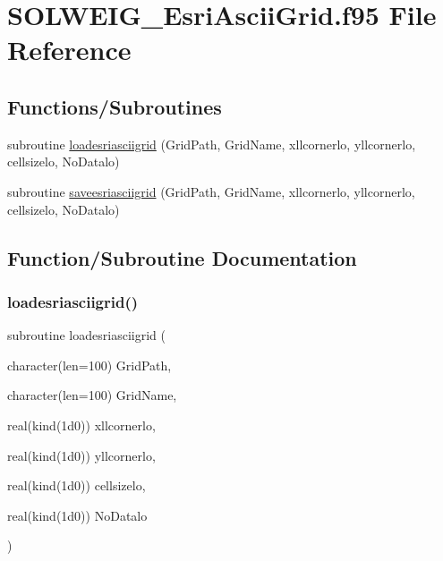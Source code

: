\hypertarget{_s_o_l_w_e_i_g___esri_ascii_grid_8f95}{}\section{S\+O\+L\+W\+E\+I\+G\+\_\+\+Esri\+Ascii\+Grid.\+f95 File Reference}
\label{_s_o_l_w_e_i_g___esri_ascii_grid_8f95}
\subsection*{Functions/\+Subroutines}
\begin{DoxyCompactItemize}
\item 
subroutine \hyperlink{_s_o_l_w_e_i_g___esri_ascii_grid_8f95_ac37f664443300ece9cc0c2682843415f}{loadesriasciigrid} (Grid\+Path, Grid\+Name, xllcornerlo, yllcornerlo, cellsizelo, No\+Datalo)
\item 
subroutine \hyperlink{_s_o_l_w_e_i_g___esri_ascii_grid_8f95_a3489cd5023a70f0232cc533e6daa3884}{saveesriasciigrid} (Grid\+Path, Grid\+Name, xllcornerlo, yllcornerlo, cellsizelo, No\+Datalo)
\end{DoxyCompactItemize}


\subsection{Function/\+Subroutine Documentation}
\mbox{\label{_s_o_l_w_e_i_g___esri_ascii_grid_8f95_ac37f664443300ece9cc0c2682843415f}} 
\subsubsection{\texorpdfstring{loadesriasciigrid()}{loadesriasciigrid()}}
{\footnotesize\ttfamily subroutine loadesriasciigrid (\begin{DoxyParamCaption}\item[{character(len=100)}]{Grid\+Path,  }\item[{character(len=100)}]{Grid\+Name,  }\item[{real(kind(1d0))}]{xllcornerlo,  }\item[{real(kind(1d0))}]{yllcornerlo,  }\item[{real(kind(1d0))}]{cellsizelo,  }\item[{real(kind(1d0))}]{No\+Datalo }\end{DoxyParamCaption})}



